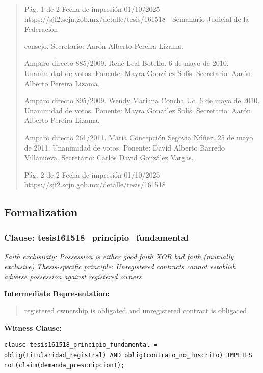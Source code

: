 \documentclass[11pt,a4paper]{article}
\begin{document}
\begin{quote}
                                              Pág. 1 de 2              Fecha de impresión 01/10/2025
  https://sjf2.scjn.gob.mx/detalle/tesis/161518
                                                  Semanario Judicial de la Federación

consejo. Secretario: Aarón Alberto Pereira Lizama.

Amparo directo 885/2009. René Leal Botello. 6 de mayo de 2010. Unanimidad de votos. Ponente:
Mayra González Solís. Secretario: Aarón Alberto Pereira Lizama.

Amparo directo 895/2009. Wendy Mariana Concha Uc. 6 de mayo de 2010. Unanimidad de votos.
Ponente: Mayra González Solís. Secretario: Aarón Alberto Pereira Lizama.

Amparo directo 261/2011. María Concepción Segovia Núñez. 25 de mayo de 2011. Unanimidad de
votos. Ponente: David Alberto Barredo Villanueva. Secretario: Carlos David González Vargas.




                                             Pág. 2 de 2       Fecha de impresión 01/10/2025
  https://sjf2.scjn.gob.mx/detalle/tesis/161518

\end{quote}

\subsection{Formalization}

\subsubsection{Clause: tesis161518\_principio\_fundamental}

\textit{Faith exclusivity: Possession is either good faith XOR bad faith (mutually exclusive) Thesis-specific principle: Unregistered contracts cannot establish adverse possession against registered owners}

\textbf{Intermediate Representation:}

\begin{quote}
registered ownership is obligated and unregistered contract is obligated
\end{quote}

\textbf{Witness Clause:}

\begin{lstlisting}[style=witnessstyle, language=Witness]
clause tesis161518_principio_fundamental = oblig(titularidad_registral) AND oblig(contrato_no_inscrito) IMPLIES not(claim(demanda_prescripcion));
\end{lstlisting}
\end{document}
